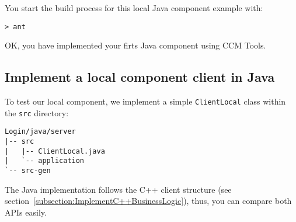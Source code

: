 You start the build process for this local Java component example with:
\begin{verbatim}
> ant
\end{verbatim}

OK, you have implemented your firts Java component using CCM Tools.


\subsection{Implement a local component client in Java}
\label{subsection:ImplementLocalComponentClient}

To test our local component, we implement a simple {\tt ClientLocal} class
within the {\tt src} directory:
\begin{verbatim}
Login/java/server
|-- src
|   |-- ClientLocal.java
|   `-- application
`-- src-gen
\end{verbatim}

The Java implementation follows the C++ client structure 
(see section~\ref{subsection:ImplementC++BusinessLogic}), 
thus, you can compare both APIs easily.

